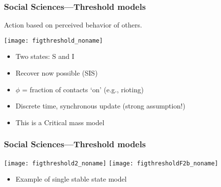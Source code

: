 \begin{frame}
  \frametitle{Social Sciences---Threshold models}

  Action based on perceived behavior of others.

  \texttt{[image: figthreshold\_noname]}

  \begin{itemize}
  \item<1-> Two states: S and I
  \item<1-> Recover now possible (SIS)
  \item<1-> $\phi$ = fraction of contacts `on' (e.g., rioting)
  \item<2-> Discrete time, synchronous update (strong assumption!)
  \item<3-> This is a \alert{Critical mass model}
  \end{itemize}

\end{frame}



\begin{frame}
  \frametitle{Social Sciences---Threshold models}

  \texttt{[image: figthreshold2\_noname]}
  \texttt{[image: figthresholdF2b\_noname]}\\

  \begin{itemize}
  \item Example of single stable state model
  \end{itemize}

\end{frame}


